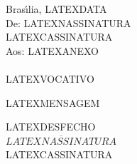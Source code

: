 \documentclass[12pt]{artigo}
\begin{document}
\setlength{\baselineskip}{8mm} 

\vdois
\timbrado

\noindent
\hfill Bras\'{\i}lia, LATEXDATA
\vspace*{5mm} \\
De:  LATEXNASSINATURA \\
\hdez 
{\small LATEXCASSINATURA}
\\
Aos: LATEXANEXO
\\ 
\vspace*{10mm} \\

LATEXVOCATIVO\,

\bigskip

LATEXMENSAGEM
\vspace*{1.5cm}

\hspace*{5cm}
\begin{minipage}{9cm}
\begin{center}
LATEXDESFECHO\,
\vspace*{1.5cm} 
\\
{\bf $\overline{LATEXNASSINATURA}$}
\\
{\small LATEXCASSINATURA}
\end{center} 
\end{minipage}
\end{document}
